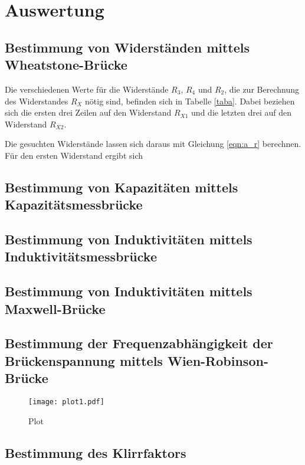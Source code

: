 \section{Auswertung}
\label{sec:Auswertung}

\subsection{Bestimmung von Widerständen mittels Wheatstone-Brücke}
Die verschiedenen Werte für die Widerstände $R_3$, $R_4$ und $R_2$, die zur Berechnung des Widerstandes $R_X$
nötig sind, befinden sich in Tabelle \ref{taba}. Dabei beziehen sich die ersten drei Zeilen auf den Widerstand
$R_{X1}$ und die letzten drei auf den Widerstand $R_{X2}$.

Die gesuchten Widerstände lassen sich daraus mit Gleichung \eqref{eqn:a_r} berechnen.
Für den ersten Widerstand ergibt sich
\begin{equation*}

\end{equation*}

\subsection{Bestimmung von Kapazitäten mittels Kapazitätsmessbrücke}

\subsection{Bestimmung von Induktivitäten mittels Induktivitätsmessbrücke}

\subsection{Bestimmung von Induktivitäten mittels Maxwell-Brücke}

\subsection{Bestimmung der Frequenzabhängigkeit der Brückenspannung mittels Wien-Robinson-Brücke}

\begin{figure}
 \centering
 \texttt{[image: plot1.pdf]}
 \caption{Plot}
 \label{fig:plot}
\end{figure}

\subsection{Bestimmung des Klirrfaktors}